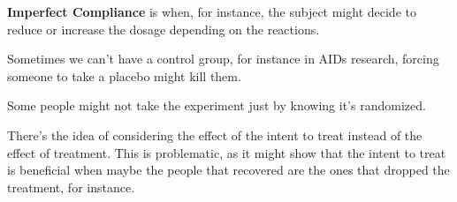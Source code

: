\textbf{Imperfect Compliance} is when, for instance, the subject might decide to reduce or increase the dosage depending on the reactions.

Sometimes we can't have a control group, for instance in AIDs research, forcing someone to take a placebo might kill them.

Some people might not take the experiment just by knowing it's randomized.

There's the idea of considering the effect of the intent to treat instead of the effect of treatment. This is problematic, as it might show that the intent to treat is beneficial when maybe the people that recovered are the ones that dropped the treatment, for instance.


